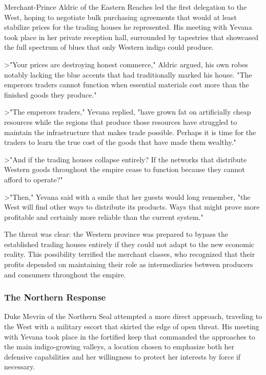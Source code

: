 Merchant-Prince Aldric of the Eastern Reaches led the first delegation
to the West, hoping to negotiate bulk purchasing agreements that would
at least stabilize prices for the trading houses he represented. His
meeting with Yevana took place in her private reception hall, surrounded
by tapestries that showcased the full spectrum of blues that only
Western indigo could produce.

\textgreater"Your prices are destroying honest commerce," Aldric argued,
his own robes notably lacking the blue accents that had traditionally
marked his house. "The emperor\textquotesingle s traders cannot function
when essential materials cost more than the finished goods they
produce."

\textgreater"The emperor\textquotesingle s traders," Yevana replied,
"have grown fat on artificially cheap resources while the regions that
produce those resources have struggled to maintain the infrastructure
that makes trade possible. Perhaps it is time for the traders to learn
the true cost of the goods that have made them wealthy."

\textgreater"And if the trading houses collapse entirely? If the
networks that distribute Western goods throughout the empire cease to
function because they cannot afford to operate?"

\textgreater"Then," Yevana said with a smile that her guests would long
remember, "the West will find other ways to distribute its products.
Ways that might prove more profitable and certainly more reliable than
the current system."

The threat was clear: the Western province was prepared to bypass the
established trading houses entirely if they could not adapt to the new
economic reality. This possibility terrified the merchant classes, who
recognized that their profits depended on maintaining their role as
intermediaries between producers and consumers throughout the empire.

\subsubsection{The Northern Response}\label{the-northern-response}

Duke Mevrin of the Northern Seal attempted a more direct approach,
traveling to the West with a military escort that skirted the edge of
open threat. His meeting with Yevana took place in the fortified keep
that commanded the approaches to the main indigo-growing valleys, a
location chosen to emphasize both her defensive capabilities and her
willingness to protect her interests by force if necessary.

